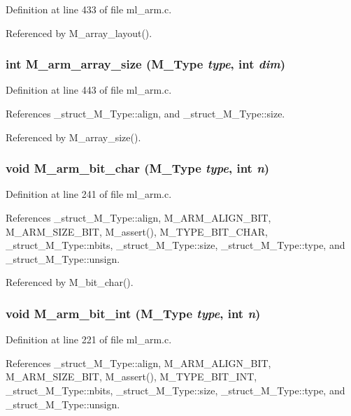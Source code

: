 Definition at line 433 of file ml\_\-arm.c.

Referenced by M\_\-array\_\-layout().
\subsubsection{\setlength{\rightskip}{0pt plus 5cm}int M\_\-arm\_\-array\_\-size (\bf{M\_\-Type} {\em type}, int {\em dim})}\label{ml__arm_8c_c0d585bf88b2f02e7dcf5f7dba236a0f}




Definition at line 443 of file ml\_\-arm.c.

References \_\-struct\_\-M\_\-Type::align, and \_\-struct\_\-M\_\-Type::size.

Referenced by M\_\-array\_\-size().
\subsubsection{\setlength{\rightskip}{0pt plus 5cm}void M\_\-arm\_\-bit\_\-char (\bf{M\_\-Type} {\em type}, int {\em n})}\label{ml__arm_8c_dae20b3632fbb5d3b9b4ead23adf8fd5}




Definition at line 241 of file ml\_\-arm.c.

References \_\-struct\_\-M\_\-Type::align, M\_\-ARM\_\-ALIGN\_\-BIT, M\_\-ARM\_\-SIZE\_\-BIT, M\_\-assert(), M\_\-TYPE\_\-BIT\_\-CHAR, \_\-struct\_\-M\_\-Type::nbits, \_\-struct\_\-M\_\-Type::size, \_\-struct\_\-M\_\-Type::type, and \_\-struct\_\-M\_\-Type::unsign.

Referenced by M\_\-bit\_\-char().
\subsubsection{\setlength{\rightskip}{0pt plus 5cm}void M\_\-arm\_\-bit\_\-int (\bf{M\_\-Type} {\em type}, int {\em n})}\label{ml__arm_8c_59b2f811f2897305c9fda06e3b30c9a7}




Definition at line 221 of file ml\_\-arm.c.

References \_\-struct\_\-M\_\-Type::align, M\_\-ARM\_\-ALIGN\_\-BIT, M\_\-ARM\_\-SIZE\_\-BIT, M\_\-assert(), M\_\-TYPE\_\-BIT\_\-INT, \_\-struct\_\-M\_\-Type::nbits, \_\-struct\_\-M\_\-Type::size, \_\-struct\_\-M\_\-Type::type, and \_\-struct\_\-M\_\-Type::unsign.

